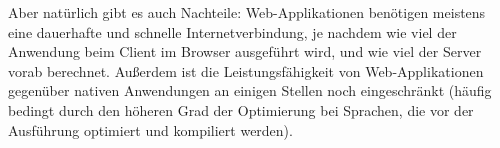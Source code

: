 Aber natürlich gibt es auch Nachteile: Web-Applikationen benötigen meistens eine dauerhafte und schnelle Internetverbindung, je nachdem wie viel der Anwendung beim Client im Browser ausgeführt wird, und wie viel der Server vorab berechnet. Außerdem ist die Leistungsfähigkeit von Web-Applikationen gegenüber nativen Anwendungen an einigen Stellen noch eingeschränkt (häufig bedingt durch den höheren Grad der Optimierung bei Sprachen, die vor der Ausführung optimiert und kompiliert werden).

